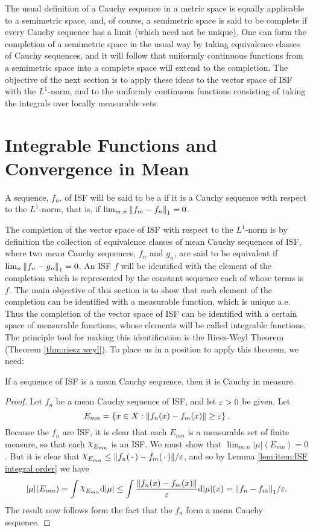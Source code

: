 The usual definition of a Cauchy sequence in a metric space is equally applicable to a semimetric space, and, of course, a semimetric space is said to be complete if every Cauchy sequence has a limit (which need not be unique). One can form the completion of a semimetric space in the usual way by taking equivalence classes of Cauchy sequences, and it will follow that uniformly continuous functions from a semimetric space into a complete space will extend to the completion. The objective of the next section is to apply these ideas to the vector space of ISF with the $L^1$-norm, and to the uniformly continuous functions consisting of taking the integrals over locally measurable sets.

\section{Integrable Functions and Convergence in Mean}

\begin{definition}
A sequence, $f_n$, of ISF will be said to be a  if it is a Cauchy sequence with respect to the $L^1$-norm, that is, if $\lim_{m, n}\norm{f_m-f_n}_1=0$.
\end{definition}

The completion of the vector space of ISF with respect to the $L^1$-norm is by definition the collection of equivalence classes of mean Cauchy sequences of ISF, where two mean Cauchy sequences, $f_n$ and $g_n$, are said to be equivalent if $\lim_n\norm{f_n-g_n}_1=0$. An ISF $f$ will be identified with the element of the completion which is represented by the constant sequence each of whose terms is $f$. The main objective of this section is to show that each element of the completion can be identified with a measurable function, which is unique a.e. Thus the completion of the vector space of ISF can be identified with a certain space of measurable functions, whose elements will be called integrable functions. The principle tool for making this identification is the Riesz-Weyl Theorem (Theorem \ref{thm:riesz weyl}). To place us in a position to apply this theorem, we need:

\begin{lemma}
\label{lem:ISF mean cauchy implies cauchy in measure}
If a sequence of ISF is a mean Cauchy sequence, then it is Cauchy in measure.
\end{lemma}

\begin{proof}
Let $f_n$ be a mean Cauchy sequence of ISF, and let $\varepsilon>0$ be given. Let $$E_{mn}=\left\{x\in X:\norm{f_n(x)-f_m(x)}\geq\varepsilon\right\}.$$ Because the $f_n$ are ISF, it is clear that each $E_{mn}$ is a measurable set of finite measure, so that each $\idf{E_{mn}}$ is an ISF. We must show that $\lim_{m,n}|\mu|(E_{mn})=0$. But it is clear that $\idf{E_{mn}}\leq\norm{f_n(\imarg)-f_m(\imarg)}/\ep$, and so by Lemma \ref{lem:item:ISF integral order} we have $$|\mu|(E_{mn})=\int\idf{E_{mn}}\dd|\mu|\leq\int\frac{\norm{f_n(x)-f_m(x)}}{\ep}\dd|\mu|(x)=\norm{f_n-f_m}_1/\ep.$$ The result now follows form the fact that the $f_n$ form a mean Cauchy sequence.
\end{proof}

